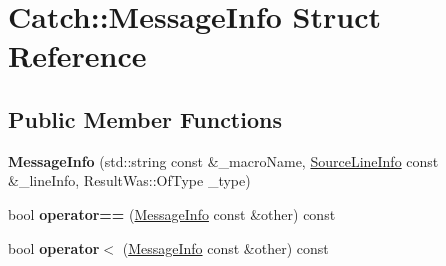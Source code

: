 \hypertarget{struct_catch_1_1_message_info}{\section{Catch\-:\-:Message\-Info Struct Reference}
\label{struct_catch_1_1_message_info}
}
\subsection*{Public Member Functions}
\begin{DoxyCompactItemize}
\item 
\hypertarget{struct_catch_1_1_message_info_a2e336c33ebef7af3c1bbae6a56e14f8a}{{\bfseries Message\-Info} (std\-::string const \&\-\_\-macro\-Name, \hyperlink{struct_catch_1_1_source_line_info}{Source\-Line\-Info} const \&\-\_\-line\-Info, Result\-Was\-::\-Of\-Type \-\_\-type)}\label{struct_catch_1_1_message_info_a2e336c33ebef7af3c1bbae6a56e14f8a}

\item 
\hypertarget{struct_catch_1_1_message_info_a30fe117138e568c5a9dfdabb7de6e790}{bool {\bfseries operator==} (\hyperlink{struct_catch_1_1_message_info}{Message\-Info} const \&other) const }\label{struct_catch_1_1_message_info_a30fe117138e568c5a9dfdabb7de6e790}

\item 
\hypertarget{struct_catch_1_1_message_info_a7a2b1ec3772cd35176e2ee25a94be16a}{bool {\bfseries operator$<$} (\hyperlink{struct_catch_1_1_message_info}{Message\-Info} const \&other) const }\label{struct_catch_1_1_message_info_a7a2b1ec3772cd35176e2ee25a94be16a}

\end{DoxyCompactItemize}
